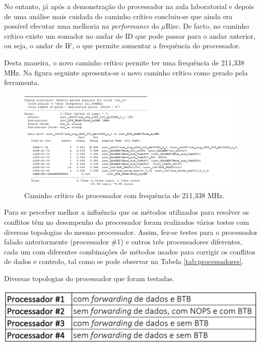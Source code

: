 \documentclass[11pt]{article}
\numberwithin{equation}{section}
\begin{document}
No entanto, já após a demonstração do processador na aula laboratorial e depois de uma análise mais cuidada do caminho crítico concluiu-se que ainda era possível efecutar uma melhoria na \textit{performance} do $\mu$Risc. De facto, no caminho crítico existe um somador no andar de ID que pode passar para o andar anterior, ou seja, o andar de IF, o que permite aumentar a frequência do processador. 

Desta maneira, o novo caminho crítico permite ter uma frequência de 211,338 MHz. Na figura seguinte apresenta-se o novo caminho crítico como gerado pela ferramenta.

\begin{figure}[H]
	\centering
	\includegraphics[keepaspectratio=true, scale=0.35]{imagens/freq211}
	\vspace{-0.5em}
	\caption{Caminho crítico do processador com frequência de 211,338 MHz.}
	\label{fig:211}
	\vspace{-0.8em}
\end{figure} 

Para se perceber melhor a influência que os métodos utilizados para resolver os conflitos têm no desempenho do processador foram realizados vários testes com diversas topologias do mesmo processador. Assim, fez-se testes para o processador falado anteriormente (processador \#1) e outros três processadores diferentes, cada um com diferentes combinações de métodos usados para corrigir os conflitos de dados e controlo, tal como se pode observar na Tabela \ref{tab:processadores}.

\begin{table}[H]
	\centering
	\caption{Diversas topologias do processador que foram testadas.}
	\vspace{-1.5mm}
	\includegraphics[keepaspectratio=true, scale=0.40]{tabelas/processadores}
	\label{tab:processadores}
\end{table}
\end{document}
